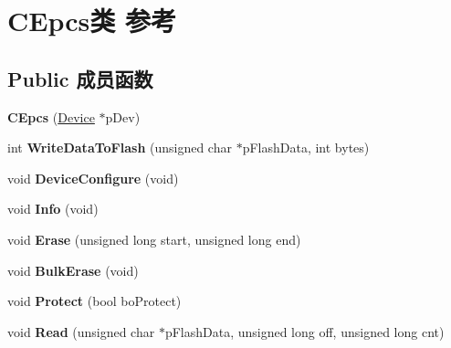 \hypertarget{class_c_epcs}{\section{C\+Epcs类 参考}
\label{class_c_epcs}
}
\subsection*{Public 成员函数}
\begin{DoxyCompactItemize}
\item 
\hypertarget{class_c_epcs_a491578697a281b73c2d31376e57191cc}{{\bfseries C\+Epcs} (\hyperlink{classmv_i_m_p_a_c_t_1_1acquire_1_1_device}{Device} $\ast$p\+Dev)}\label{class_c_epcs_a491578697a281b73c2d31376e57191cc}

\item 
\hypertarget{class_c_epcs_a3a8f3c50d9fc17e6b481390f34d6546e}{int {\bfseries Write\+Data\+To\+Flash} (unsigned char $\ast$p\+Flash\+Data, int bytes)}\label{class_c_epcs_a3a8f3c50d9fc17e6b481390f34d6546e}

\item 
\hypertarget{class_c_epcs_a0fc83d9c588d698666d5c651816cbd3c}{void {\bfseries Device\+Configure} (void)}\label{class_c_epcs_a0fc83d9c588d698666d5c651816cbd3c}

\item 
\hypertarget{class_c_epcs_aef12538417cb9778ac2e585fb7ad81eb}{void {\bfseries Info} (void)}\label{class_c_epcs_aef12538417cb9778ac2e585fb7ad81eb}

\item 
\hypertarget{class_c_epcs_a101a759115f4a7951eb73c6e36d8ec39}{void {\bfseries Erase} (unsigned long start, unsigned long end)}\label{class_c_epcs_a101a759115f4a7951eb73c6e36d8ec39}

\item 
\hypertarget{class_c_epcs_a7f443392f1ab2ff19855edcaced772fd}{void {\bfseries Bulk\+Erase} (void)}\label{class_c_epcs_a7f443392f1ab2ff19855edcaced772fd}

\item 
\hypertarget{class_c_epcs_a0e75e28c790b266e3688184a999261cd}{void {\bfseries Protect} (bool bo\+Protect)}\label{class_c_epcs_a0e75e28c790b266e3688184a999261cd}

\item 
\hypertarget{class_c_epcs_a3969075733347b5a4b1175001254c741}{void {\bfseries Read} (unsigned char $\ast$p\+Flash\+Data, unsigned long off, unsigned long cnt)}\label{class_c_epcs_a3969075733347b5a4b1175001254c741}


\end{DoxyCompactItemize}
